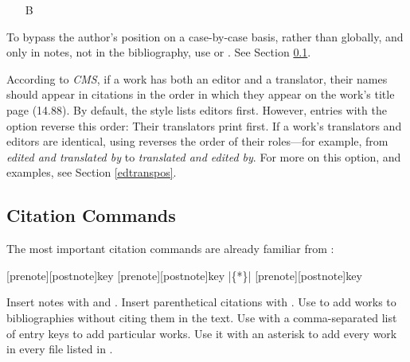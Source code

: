 \documentclass[11pt,letterpaper,oneside]{article}
\begin{document}
\begin{optionlist}
\begin{itemize}
\item[B] 
\end{itemize}

\noindent To bypass the author's position on a case-by-case basis,
rather than globally, and only in notes, not in the bibliography, use
 or . See Section \ref{citecmds}.


According to \textit{CMS}, if a work has both an editor and a
translator, their names should appear in citations in the order in
which they appear on the work's title page (14.88). By default, the
style lists editors first. However, entries with the option
 reverse this order: Their translators print
first. If a work's translators and editors are identical, using
 reverses the order of their roles---for example,
from \textit{edited and translated by} to \textit{translated and
edited by}. For more on this option, and examples, see Section
\ref{edtranspos}.

\end{optionlist}

\subsection{Citation Commands}
\label{citecmds}

The most important citation commands are already familiar from
\biblatex:

\begin{ltxsyntax}

[prenote][postnote]{key}
[prenote][postnote]{key}
|\{*\}|
[prenote][postnote]{key}

\end{ltxsyntax}

\noindent Insert notes with  and . Insert
parenthetical citations with . Use  to add
works to bibliographies without citing them in the text. Use
 with a comma-separated list of entry keys to add
particular works. Use it with an asterisk to add every work in every
 file listed in .
\end{document}
